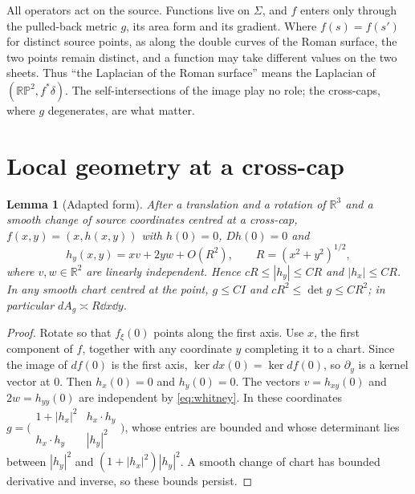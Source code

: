 \documentclass[11pt]{article}
\newtheorem{lemma}[theorem]{Lemma}
\theoremstyle{definition}\newtheorem{definition}[theorem]{Definition}
\theoremstyle{remark}\newtheorem{remark}[theorem]{Remark}
\newcommand{\R}{\mathbb R}\newcommand{\C}{\mathbb C}\newcommand{\Z}{\mathbb Z}
\begin{document}
All operators act on the source. Functions live on $\Sigma$, and $f$ enters only
through the pulled-back metric $g$, its area form and its gradient. Where
$f(s)=f(s')$ for distinct source points, as along the double curves of the Roman
surface, the two points remain distinct, and a function may take different
values on the two sheets. Thus ``the Laplacian of the Roman surface'' means the
Laplacian of $(\mathbb{RP}^2,f^*\delta)$. The self-intersections of the image
play no role; the cross-caps, where $g$ degenerates, are what matter.

\section{Local geometry at a cross-cap}\label{sec:local}
\begin{lemma}[Adapted form]\label{lem:adapted}
After a translation and a rotation of $\R^3$ and a smooth change of source
coordinates centred at a cross-cap, $f(x,y)=(x,h(x,y))$ with $h(0)=0$,
$Dh(0)=0$ and
\[
 h_y(x,y)=xv+2yw+O(R^2),\qquad R=(x^2+y^2)^{1/2},
\]
where $v,w\in\R^2$ are linearly independent. Hence $cR\leq|h_y|\leq CR$ and
$|h_x|\leq CR$. In any smooth chart centred at the point, $g\leq CI$ and
$cR^2\leq\det g\leq CR^2$; in particular $dA_g\asymp R\dd x\dd y$.
\end{lemma}
\begin{proof}
Rotate so that $f_\xi(0)$ points along the first axis. Use $x$, the first
component of $f$, together with any coordinate $y$ completing it to a chart.
Since the image of $df(0)$ is the first axis, $\ker dx(0)=\ker df(0)$, so
$\partial_y$ is a kernel vector at $0$. Then $h_x(0)=0$ and $h_y(0)=0$. The vectors $v=h_{xy}(0)$ and $2w=h_{yy}(0)$
are independent by \eqref{eq:whitney}. In these coordinates
$g=\bigl(\begin{smallmatrix}1+|h_x|^2&h_x\cdot h_y\\h_x\cdot h_y&|h_y|^2\end{smallmatrix}\bigr)$,
whose entries are bounded and whose determinant lies between $|h_y|^2$ and
$(1+|h_x|^2)|h_y|^2$. A smooth change of chart has bounded derivative and
inverse, so these bounds persist.
\end{proof}
\end{document}
